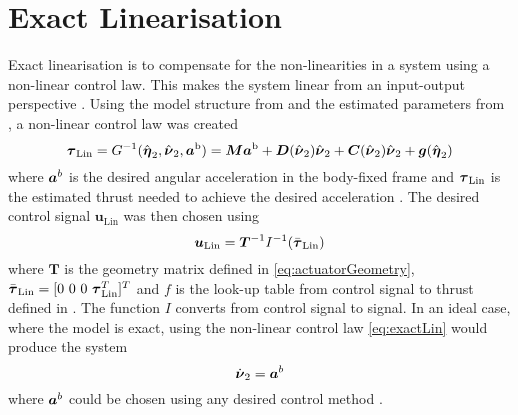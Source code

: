 \section{Exact Linearisation}  
Exact linearisation is to compensate for the non-linearities in a system using a non-linear control law. This makes the system linear from an input-output perspective \citep{reglerteori}. Using the model structure from  and the estimated parameters from , a non-linear control law was created 
\begin{equation}\label{eq:exactLin}
\boldsymbol{\tau}_{\text{Lin}} = G^{-1}(\hat{\boldsymbol{\eta}}_{2},\hat{\boldsymbol{\nu}}_{2},\boldsymbol{a}^{\text{b}}) = \boldsymbol{M} \boldsymbol{a}^{\text{b}} + \boldsymbol{D}(\hat{\boldsymbol{\nu}}_{2})\hat{\boldsymbol{\nu}}_{2} + \boldsymbol{C}(\hat{\boldsymbol{\nu}}_{2})\hat{\boldsymbol{\nu}}_{2} + \boldsymbol{g}(\hat{\boldsymbol{\eta}}_{2})
\end{equation}
where $\boldsymbol{a}^b$ is the desired angular acceleration in the body-fixed frame and $\boldsymbol{\tau}_{\text{Lin}}$ is the estimated thrust needed to achieve the desired acceleration \citep{fossen}.
The desired control signal $\boldsymbol{u}_{\text{Lin}}$ was then chosen using 
\begin{equation}\label{eq:linControlSignal}
\boldsymbol{u}_{\text{Lin}} = \boldsymbol{T}^{-1}I^{-1}(\bar{\boldsymbol{\tau}}_{\text{Lin}})
\end{equation} where $\boldsymbol{T}$ is the geometry matrix defined in \eqref{eq:actuatorGeometry}, $\bar{\boldsymbol{\tau}}_{\text{Lin}}=[0~0~0~\boldsymbol{\tau}_{\text{Lin}}^T]^T$ and  $f$ is the look-up table from control signal to thrust defined in . The function $I$ converts from control signal to \abbrPWM signal.
In an ideal case, where the model is exact, using the non-linear control law \eqref{eq:exactLin} would produce the system
\begin{equation}\label{eq:exactLinSys}
\dot{\boldsymbol{\nu}}_{2} = \boldsymbol{a}^b
\end{equation} 
where $\boldsymbol{a}^b$ could be chosen using any desired control method \citep[p.451]{fossen2011}.
